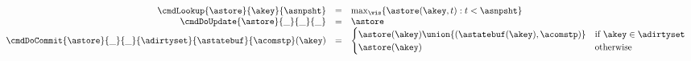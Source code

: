 
\[
  \begin{array}{rcl}
    \cmdLookup{\astore}{\akey}{\asnpsht} & = &
        \max_{\vis} \{ \astore(\akey, t) : {t < \asnpsht} \}
    \\
    \cmdDoUpdate{\astore}{\_}{\_}{\_}    & = & \astore
    \\
    \cmdDoCommit{\astore}{\_}{\_}{\adirtyset}{\astatebuf}{\acomstp}(\akey)
    & = & 
      \begin{cases}
         \astore(\akey) \union \{(\astatebuf(\akey), \acomstp)\} 
            & \text{if}\ \akey \in \adirtyset
        \\
         \astore(\akey) & \text{otherwise}
       \end{cases}
    \\
  \end{array}
\]
%

